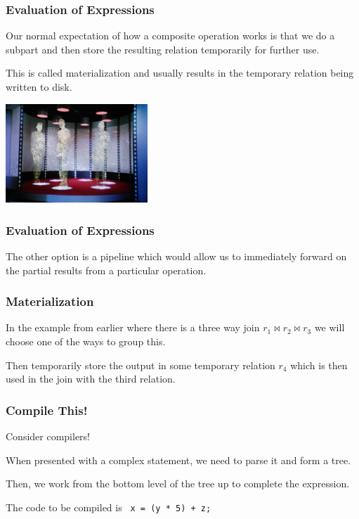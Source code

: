 \begin{frame}
\frametitle{Evaluation of Expressions}

Our normal expectation of how a composite operation works is that we do a subpart and then store the resulting relation temporarily for further use.

This is called \alert{materialization} and usually results in the temporary relation being written to disk. 

\begin{center}
	\includegraphics[width=0.4\textwidth]{images/beaming.jpg}
\end{center}

\end{frame}

\begin{frame}
\frametitle{Evaluation of Expressions}


The other option is a \alert{pipeline} which would allow us to immediately forward on the partial results from a particular operation.


\end{frame}

\begin{frame}
\frametitle{Materialization}

In the example from earlier where there is a three way join $r_{1} \bowtie r_{2} \bowtie r_{3}$ we will choose one of the ways to group this.

Then temporarily store the output in some temporary relation $r_{4}$ which is then used in the join with the third relation. 

\end{frame}

\begin{frame}
\frametitle{Compile This!}

Consider compilers!

When presented with a complex statement, we need to parse it and form a tree. 

Then, we work from the bottom level of the tree up to complete the expression. 

The code to be compiled is \texttt{ x = (y * 5) + z; }

\end{frame}

